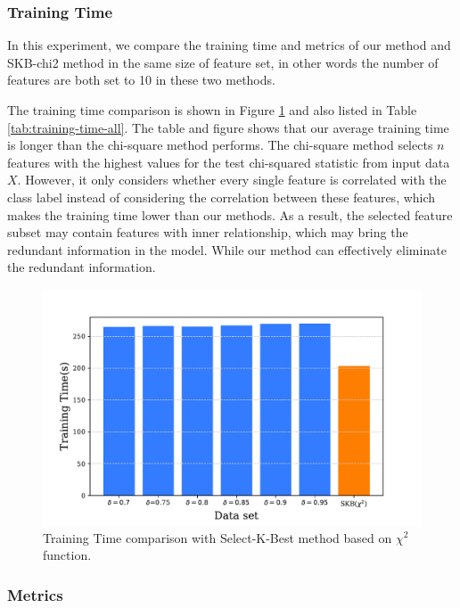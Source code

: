 \documentclass{ieeeaccess}
\theoremstyle{definition}
\begin{document}
\subsubsection{Training Time}

In this experiment, we compare the training time and metrics of our method and SKB-chi2 method in the same size of feature set, in other words the number of features are both set to 10 in these two methods.

The training time comparison is shown in Figure \ref{fig:training-time-with-chi2} and also listed in Table \ref{tab:training-time-all}. The table and figure shows that our average training time is longer than the chi-square method performs. The chi-square method selects $n$ features with the highest values for the test chi-squared statistic from input data $X$. However, it only considers whether every single feature is correlated with the class label instead of considering the correlation between these features, which makes the training time lower than our methods.
As a result, the selected feature subset may contain features with inner relationship, which may bring the redundant information in the model. While our method can effectively eliminate the redundant information.

\begin{figure}[!htpb]
    \centering
    \includegraphics[scale=0.4]{fig/training-time-chi2.pdf}
    \caption{Training Time comparison with Select-K-Best method based on $\chi^2$ function.}
    \label{fig:training-time-with-chi2}
\end{figure}

\subsubsection{Metrics}
\end{document}
